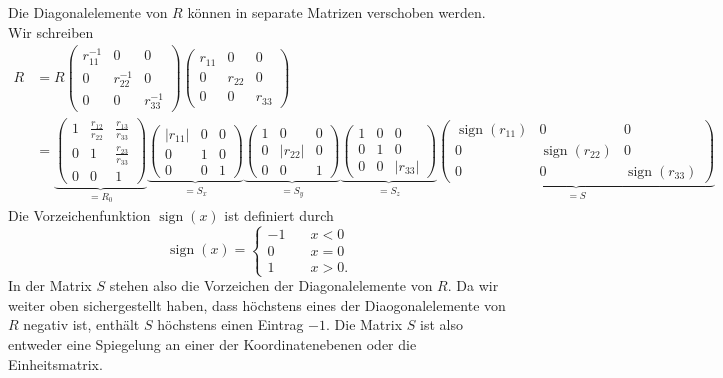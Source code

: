 Die Diagonalelemente von $R$ können in separate Matrizen verschoben werden.
Wir schreiben 
\begin{align*}
R
&=
R
\begin{pmatrix}
r_{11}^{-1}&     0     &     0     \\
     0     &r_{22}^{-1}&     0     \\
     0     &     0     &r_{33}^{-1}
\end{pmatrix}
\begin{pmatrix}
r_{11}&   0  &  0   \\
   0  &r_{22}&  0   \\
   0  &   0  &r_{33}
\end{pmatrix}
\\
&=
\underbrace{
\begin{pmatrix}
1&\frac{r_{12}}{r_{22}}&\frac{r_{13}}{r_{33}}\\
0&            1        &\frac{r_{23}}{r_{33}}\\
0&            0        &            1
\end{pmatrix}
}_{\displaystyle=R_0}
\underbrace{
\begin{pmatrix}
|r_{11}|&0&0\\
  0   &1&0\\
  0   &0&1
\end{pmatrix}
}_{\displaystyle = S_x}
\underbrace{
\begin{pmatrix}
1&0&0\\
0&|r_{22}|&0\\
0&0&1
\end{pmatrix}
}_{\displaystyle = S_y}
\underbrace{
\begin{pmatrix}
1&0&0\\
0&1&0\\
0&0&|r_{33}|
\end{pmatrix}
}_{\displaystyle = S_z}
\underbrace{
\begin{pmatrix}
\operatorname{sign}(r_{11})&0&0\\
0&\operatorname{sign}(r_{22})&0\\
0&0&\operatorname{sign}(r_{33})
\end{pmatrix}
}_{\displaystyle = S}
\end{align*}
Die Vorzeichenfunktion $\operatorname{sign}(x)$ ist definiert durch
\[
\operatorname{sign}(x)
=
\begin{cases}
-1&\quad x<0\\
0&\quad x=0\\
1&\quad x>0.
\end{cases}
\]
In der Matrix $S$ stehen also die Vorzeichen der Diagonalelemente
von $R$.
Da wir weiter oben sichergestellt haben, dass höchstens eines der
Diaogonalelemente von $R$ negativ ist, enthält $S$ höchstens
einen Eintrag $-1$.
Die Matrix $S$ ist also entweder eine Spiegelung an einer der Koordinatenebenen
oder die Einheitsmatrix.

